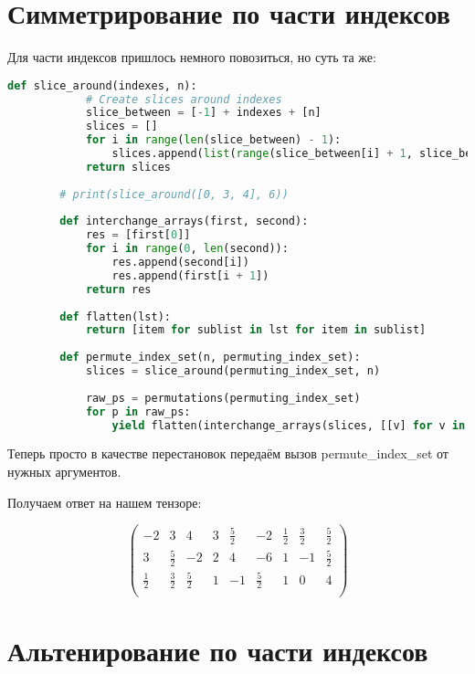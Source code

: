 \documentclass[12pt, a4paper]{article}
\newcommand\arr[2]{\left(\begin{array}{#1}#2\end{array}\right)}
\begin{document}
    \section{Симметрирование по части индексов}

    Для части индексов пришлось немного повозиться, но суть та же:

    
    \begin{lstlisting}[language=Python]
        def slice_around(indexes, n):
            # Create slices around indexes
            slice_between = [-1] + indexes + [n]
            slices = []
            for i in range(len(slice_between) - 1):
                slices.append(list(range(slice_between[i] + 1, slice_between[i + 1])))
            return slices
        
        # print(slice_around([0, 3, 4], 6))
        
        def interchange_arrays(first, second):
            res = [first[0]]
            for i in range(0, len(second)):
                res.append(second[i])
                res.append(first[i + 1])
            return res
        
        def flatten(lst):
            return [item for sublist in lst for item in sublist]
        
        def permute_index_set(n, permuting_index_set):
            slices = slice_around(permuting_index_set, n)
        
            raw_ps = permutations(permuting_index_set)
            for p in raw_ps:
                yield flatten(interchange_arrays(slices, [[v] for v in p]))
    \end{lstlisting}

    Теперь просто в качестве перестановок передаём вызов permute\_index\_set от нужных аргументов.

    Получаем ответ на нашем тензоре:

    \begin{equation}
        \arr{ccc|ccc|ccc}{
            -2 & 3 & 4 & 3 & \frac{5}{2} & -2 & \frac{1}{2} & \frac{3}{2} & \frac{5}{2}\\
            3 & \frac{5}{2} & -2 & 2 & 4 & -6 & 1 & -1 & \frac{5}{2}\\
            \frac{1}{2} & \frac{3}{2} & \frac{5}{2} & 1 & -1 & \frac{5}{2} & 1 & 0 & 4\\
        }
    \end{equation}


    \section{Альтенирование по части индексов}
\end{document}
